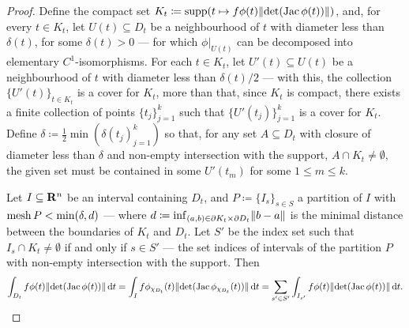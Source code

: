 \begin{proof}
Define the compact set \(K_t \coloneq \operatorname{supp}(t \mapsto f \phi(t) \lVert\det(\operatorname{Jac}
\phi(t))\rVert)\), and, for every \(t \in K_t\), let \(U(t) \subseteq D_t\) be a
neighbourhood of \(t\) with diameter less than \(\delta(t)\), for some
\(\delta(t) > 0\) --- for which \(\phi|_{U(t)}\) can be decomposed into
elementary \(C^1\)-isomorphisms. For each \(t \in K_t\), let \(U'(t) \subseteq
U(t)\) be a neighbourhood of \(t\) with diameter less than \(\delta(t)/2\) ---
with this, the collection \(\{U'(t)\}_{t \in K_t}\) is a cover for \(K_t\), more
than that, since \(K_t\) is compact, there exists a finite collection of points
\(\{t_{j}\}_{j=1}^k\) such that \(\{U'(t_j)\}_{j=1}^k\) is a cover for
\(K_t\). Define \(\delta \coloneq \frac 1 2 \min(\delta(t_j)_{j=1}^k)\) so that,
for any set \(A \subseteq D_t\) with closure of diameter less than \(\delta\)
and non-empty intersection with the support, \(A \cap K_t \neq \emptyset\), the
given set must be contained in some \(U'(t_m)\) for some \(1 \leq m \leq k\).

Let \(I \subseteq \mathbf{R}^n\) be an interval containing \(D_t\), and \(P \coloneq
\{I_{s}\}_{s \in S}\) a partition of \(I\) with \(\operatorname{mesh} P < \min(\delta, d)\)
--- where \(d \coloneq \inf_{(a, b) \in \partial K_t \times \partial D_t}
\lVert b - a\rVert\) is the minimal distance between the boundaries of \(K_t\) and
\(D_{t}\). Let \(S'\) be the index set such that \(I_s \cap K_t \neq \emptyset\)
if and only if \(s \in S'\) --- the set indices of intervals of the partition
\(P\) with non-empty intersection with the support. Then
\[
  \int_{D_t} f\phi(t) \lVert\det(\operatorname{Jac} \phi(t))\rVert\, \mathrm{d} t
  = \int_I f \phi_{\chi_{D_t}}(t)
  \lVert\det(\operatorname{Jac} \phi_{\chi_{D_t}}(t))\rVert\, \mathrm{d} t
  = \sum_{s' \in S'} \int_{I_{s'}} f \phi(t) \lVert\det(\operatorname{Jac} \phi(t))\rVert\, \mathrm{d} t.
\]


\end{proof}
